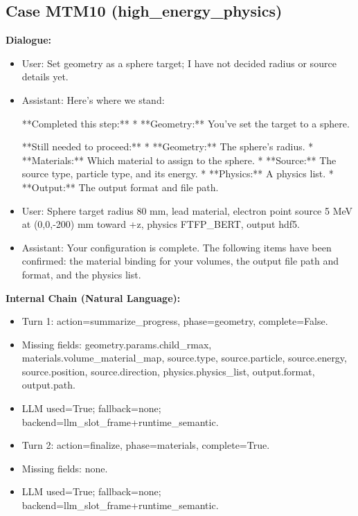 \documentclass[11pt]{ctexart}
\begin{document}
\subsection{Case MTM10 (high\_energy\_physics)}
\textbf{Dialogue:}
\begin{itemize}
\item User: Set geometry as a sphere target; I have not decided radius or source details yet.
\item Assistant: Here's where we stand:

**Completed this step:**
*   **Geometry:** You've set the target to a sphere.

**Still needed to proceed:**
*   **Geometry:** The sphere's radius.
*   **Materials:** Which material to assign to the sphere.
*   **Source:** The source type, particle type, and its energy.
*   **Physics:** A physics list.
*   **Output:** The output format and file path.
\item User: Sphere target radius 80 mm, lead material, electron point source 5 MeV at (0,0,-200) mm toward +z, physics FTFP\_BERT, output hdf5.
\item Assistant: Your configuration is complete. The following items have been confirmed: the material binding for your volumes, the output file path and format, and the physics list.
\end{itemize}
\textbf{Internal Chain (Natural Language):}
\begin{itemize}
\item Turn 1: action=summarize\_progress, phase=geometry, complete=False.
\item Missing fields: geometry.params.child\_rmax, materials.volume\_material\_map, source.type, source.particle, source.energy, source.position, source.direction, physics.physics\_list, output.format, output.path.
\item LLM used=True; fallback=none; backend=llm\_slot\_frame+runtime\_semantic.
\item Turn 2: action=finalize, phase=materials, complete=True.
\item Missing fields: none.
\item LLM used=True; fallback=none; backend=llm\_slot\_frame+runtime\_semantic.
\end{itemize}
\end{document}

